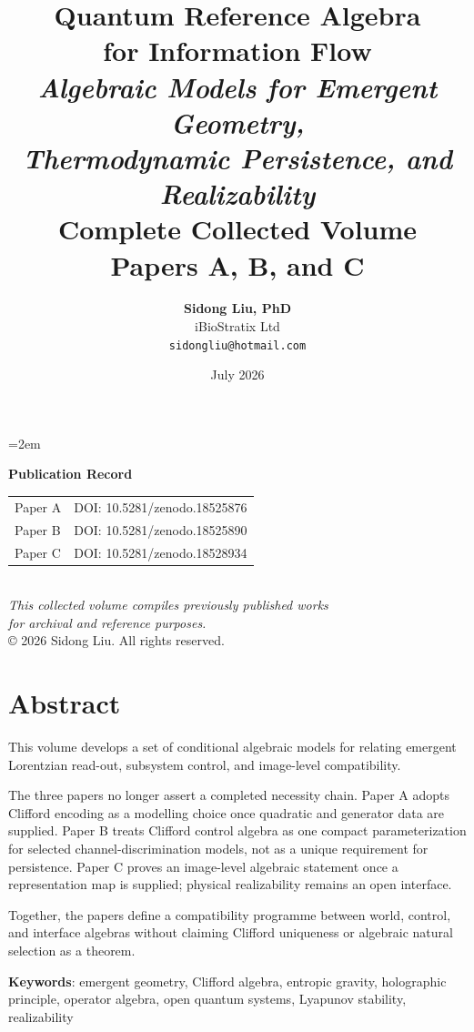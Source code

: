 \documentclass[12pt,a4paper,openany]{book}
\title{
  \vspace{-2cm}
  {\Huge\textbf{Quantum Reference Algebra\\for Information Flow}}\\[1cm]
  {\Large\textit{Algebraic Models for Emergent Geometry,\\ Thermodynamic Persistence, and Realizability}}\\[2cm]
  {\large Complete Collected Volume}\\[0.5cm]
  {\normalsize Papers A, B, and C}
}
\author{
  \textbf{Sidong Liu, PhD}\\[0.5em]
  iBioStratix Ltd\\[0.3em]
  \texttt{sidongliu@hotmail.com}
}
\date{July 2026}
\begin{document}
\emergencystretch=2em
\raggedbottom
{}

\frontmatter
\maketitle

\newpage
\thispagestyle{empty}
\vspace*{\fill}
\begin{center}
\textbf{Publication Record}\\[2em]
\begin{tabular}{ll}
Paper A & DOI: 10.5281/zenodo.18525876 \\
Paper B & DOI: 10.5281/zenodo.18525890 \\
Paper C & DOI: 10.5281/zenodo.18528934 \\
\end{tabular}
\\[3em]
\textit{This collected volume compiles previously published works\\
for archival and reference purposes.}
\\[2em]
\copyright{} 2026 Sidong Liu. All rights reserved.
\end{center}
\vspace*{\fill}

\chapter*{Abstract}

This volume develops a set of conditional algebraic models for relating emergent Lorentzian read-out, subsystem control, and image-level compatibility.

The three papers no longer assert a completed necessity chain.  Paper A adopts Clifford encoding as a modelling choice once quadratic and generator data are supplied.  Paper B treats Clifford control algebra as one compact parameterization for selected channel-discrimination models, not as a unique requirement for persistence.  Paper C proves an image-level algebraic statement once a representation map is supplied; physical realizability remains an open interface.

Together, the papers define a compatibility programme between world, control, and interface algebras without claiming Clifford uniqueness or algebraic natural selection as a theorem.

\bigskip
\noindent\textbf{Keywords}: emergent geometry, Clifford algebra, entropic gravity, holographic principle, operator algebra, open quantum systems, Lyapunov stability, realizability
\end{document}
